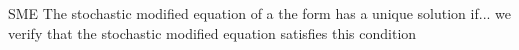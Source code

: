 \documentclass[dvipsnames, handout]{beamer}
\newcommand{\R}{\mathbb{R}}	%
\newcommand{\El}{\mathcal{L}}	%
\newcommand{\1}{\mathds{1}}	%
\DeclareMathOperator*{\dv}{d\!}		%
\begin{document}
\begin{frame}{SME}
    The stochastic modified equation of a the form has a unique solution if... we verify that the stochastic modified equation satisfies this condition
\end{frame}












\end{document}
